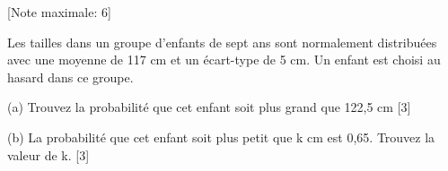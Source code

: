 \begin{question}
  \hspace*{\fill} [Note maximale: 6]\par
  \medskip
  \noindent Les tailles dans un groupe d’enfants de sept ans sont normalement distribuées avec une moyenne de 117 cm et un écart-type de 5 cm. Un enfant est choisi au hasard dans ce groupe.\par
  \medskip
  (a) Trouvez la probabilité que cet enfant soit plus grand que 122,5 cm\hspace*{\fill} [3]\par
  \medskip

  (b) La probabilité que cet enfant soit plus petit que k cm est 0,65. Trouvez la valeur de k.\hspace*{\fill} [3]\par
  
\end{question}

